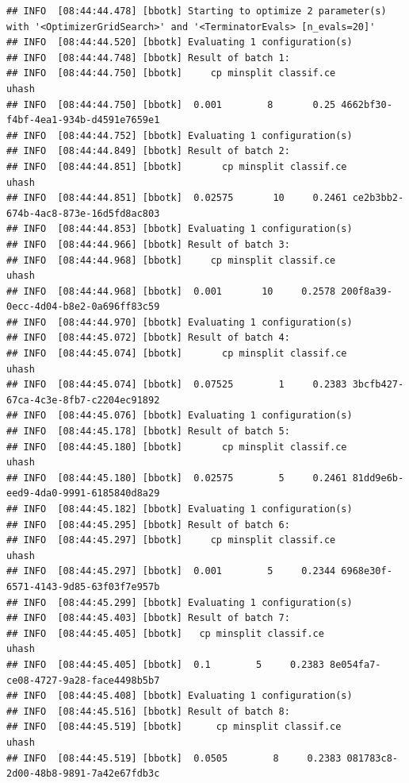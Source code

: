 \documentclass[
]{scrbook}
\begin{document}
\begin{verbatim}
## INFO  [08:44:44.478] [bbotk] Starting to optimize 2 parameter(s) with '<OptimizerGridSearch>' and '<TerminatorEvals> [n_evals=20]' 
## INFO  [08:44:44.520] [bbotk] Evaluating 1 configuration(s) 
## INFO  [08:44:44.748] [bbotk] Result of batch 1: 
## INFO  [08:44:44.750] [bbotk]     cp minsplit classif.ce                                uhash 
## INFO  [08:44:44.750] [bbotk]  0.001        8       0.25 4662bf30-f4bf-4ea1-934b-d4591e7659e1 
## INFO  [08:44:44.752] [bbotk] Evaluating 1 configuration(s) 
## INFO  [08:44:44.849] [bbotk] Result of batch 2: 
## INFO  [08:44:44.851] [bbotk]       cp minsplit classif.ce                                uhash 
## INFO  [08:44:44.851] [bbotk]  0.02575       10     0.2461 ce2b3bb2-674b-4ac8-873e-16d5fd8ac803 
## INFO  [08:44:44.853] [bbotk] Evaluating 1 configuration(s) 
## INFO  [08:44:44.966] [bbotk] Result of batch 3: 
## INFO  [08:44:44.968] [bbotk]     cp minsplit classif.ce                                uhash 
## INFO  [08:44:44.968] [bbotk]  0.001       10     0.2578 200f8a39-0ecc-4d04-b8e2-0a696ff83c59 
## INFO  [08:44:44.970] [bbotk] Evaluating 1 configuration(s) 
## INFO  [08:44:45.072] [bbotk] Result of batch 4: 
## INFO  [08:44:45.074] [bbotk]       cp minsplit classif.ce                                uhash 
## INFO  [08:44:45.074] [bbotk]  0.07525        1     0.2383 3bcfb427-67ca-4c3e-8fb7-c2204ec91892 
## INFO  [08:44:45.076] [bbotk] Evaluating 1 configuration(s) 
## INFO  [08:44:45.178] [bbotk] Result of batch 5: 
## INFO  [08:44:45.180] [bbotk]       cp minsplit classif.ce                                uhash 
## INFO  [08:44:45.180] [bbotk]  0.02575        5     0.2461 81dd9e6b-eed9-4da0-9991-6185840d8a29 
## INFO  [08:44:45.182] [bbotk] Evaluating 1 configuration(s) 
## INFO  [08:44:45.295] [bbotk] Result of batch 6: 
## INFO  [08:44:45.297] [bbotk]     cp minsplit classif.ce                                uhash 
## INFO  [08:44:45.297] [bbotk]  0.001        5     0.2344 6968e30f-6571-4143-9d85-63f03f7e957b 
## INFO  [08:44:45.299] [bbotk] Evaluating 1 configuration(s) 
## INFO  [08:44:45.403] [bbotk] Result of batch 7: 
## INFO  [08:44:45.405] [bbotk]   cp minsplit classif.ce                                uhash 
## INFO  [08:44:45.405] [bbotk]  0.1        5     0.2383 8e054fa7-ce08-4727-9a28-face4498b5b7 
## INFO  [08:44:45.408] [bbotk] Evaluating 1 configuration(s) 
## INFO  [08:44:45.516] [bbotk] Result of batch 8: 
## INFO  [08:44:45.519] [bbotk]      cp minsplit classif.ce                                uhash 
## INFO  [08:44:45.519] [bbotk]  0.0505        8     0.2383 081783c8-2d00-48b8-9891-7a42e67fdb3c 

\end{verbatim}
\end{document}
